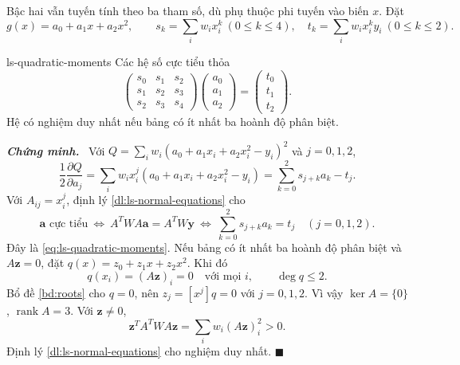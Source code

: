 \documentclass[12pt,a4paper,oneside]{book}
\numberwithin{algorithm}{chapter}
\theoremstyle{definition}
\newenvironment{chungminh}{\par\medskip\noindent\textbf{\textit{\color{mainblue}Chứng minh.}}\ }{\hfill$\blacksquare$\par\medskip}
\begin{document}
Bậc hai vẫn tuyến tính theo ba tham số, dù phụ thuộc phi tuyến vào biến $x$. Đặt
\[
 g(x)=a_0+a_1x+a_2x^2,\qquad
 s_k=\sum_iw_ix_i^k\ (0\leq k\leq4),\quad
 t_k=\sum_iw_ix_i^ky_i\ (0\leq k\leq2).
\]
\begin{menhde}{}{ls-quadratic-moments}
Các hệ số cực tiểu thỏa
\begin{equation}\label{eq:ls-quadratic-moments}
 \begin{pmatrix}s_0&s_1&s_2\\s_1&s_2&s_3\\s_2&s_3&s_4\end{pmatrix}
 \begin{pmatrix}a_0\\a_1\\a_2\end{pmatrix}
 =\begin{pmatrix}t_0\\t_1\\t_2\end{pmatrix}.
\end{equation}
Hệ có nghiệm duy nhất nếu bảng có ít nhất ba hoành độ phân biệt.
\end{menhde}
\begin{chungminh}
Với $Q=\sum_iw_i(a_0+a_1x_i+a_2x_i^2-y_i)^2$ và $j=0,1,2$,
\[
 \frac12\frac{\partial Q}{\partial a_j}
 =\sum_iw_ix_i^j(a_0+a_1x_i+a_2x_i^2-y_i)
 =\sum_{k=0}^2s_{j+k}a_k-t_j.
\]
Với $A_{ij}=x_i^j$, định lý \ref{dl:ls-normal-equations} cho
\[
 \boldsymbol a\text{ cực tiểu}
 \ \Longleftrightarrow\ A^TWA\boldsymbol a=A^TW\boldsymbol y
 \ \Longleftrightarrow\ \sum_{k=0}^2s_{j+k}a_k=t_j\quad(j=0,1,2).
\]
Đây là \eqref{eq:ls-quadratic-moments}. Nếu bảng có ít nhất ba hoành độ phân biệt và $A\boldsymbol z=0$, đặt $q(x)=z_0+z_1x+z_2x^2$. Khi đó
\[
 q(x_i)=(A\boldsymbol z)_i=0\quad\text{với mọi }i,\qquad
 \deg q\leq2.
\]
Bổ đề \ref{bd:roots} cho $q=0$, nên $z_j=[x^j]q=0$ với $j=0,1,2$. Vì vậy $\ker A=\{0\}$, $\operatorname{rank}A=3$. Với $\boldsymbol z\ne0$,
\[
 \boldsymbol z^TA^TWA\boldsymbol z
 =\sum_iw_i(A\boldsymbol z)_i^2>0.
\]
Định lý \ref{dl:ls-normal-equations} cho nghiệm duy nhất.
\end{chungminh}
\end{document}
